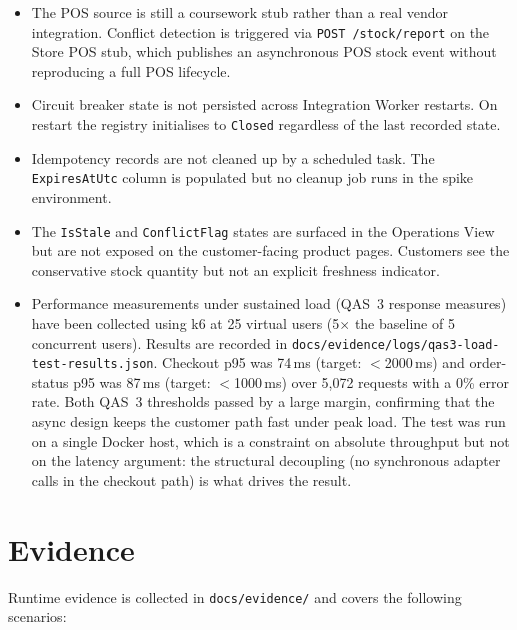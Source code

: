 \begin{itemize}
    \item The POS source is still a coursework stub rather than a real vendor integration.
    Conflict detection is triggered via \texttt{POST /stock/report} on the Store POS stub,
    which publishes an asynchronous POS stock event without reproducing a full POS lifecycle.
    \item Circuit breaker state is not persisted across Integration Worker restarts. On
    restart the registry initialises to \texttt{Closed} regardless of the last recorded
    state.
    \item Idempotency records are not cleaned up by a scheduled task. The \texttt{ExpiresAtUtc}
    column is populated but no cleanup job runs in the spike environment.
    \item The \texttt{IsStale} and \texttt{ConflictFlag} states are surfaced in the Operations
    View but are not exposed on the customer-facing product pages. Customers see the
    conservative stock quantity but not an explicit freshness indicator.
    \item Performance measurements under sustained load (QAS~3 response measures) have been
    collected using k6 at 25 virtual users (5$\times$ the baseline of 5 concurrent users).
    Results are recorded in \texttt{docs/evidence/logs/qas3-load-test-results.json}.
    Checkout p95 was 74\,ms (target: $<$2000\,ms) and order-status p95 was 87\,ms
    (target: $<$1000\,ms) over 5{,}072 requests with a 0\% error rate.
    Both QAS~3 thresholds passed by a large margin, confirming that the async design keeps
    the customer path fast under peak load. The test was run on a single Docker host, which
    is a constraint on absolute throughput but not on the latency argument: the structural
    decoupling (no synchronous adapter calls in the checkout path) is what drives the result.
\end{itemize}

\section{Evidence}

Runtime evidence is collected in \texttt{docs/evidence/} and covers the following scenarios:

